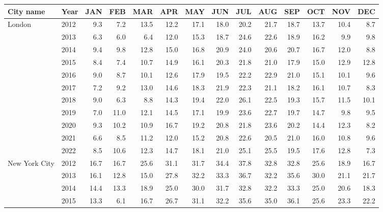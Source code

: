 \begin{table}[htbp]
\small
\begin{adjustwidth}{-1in}{-1in} %
\centering
\begin{tabular}{llrrrrrrrrrrrr}
\toprule
      City name & Year &   JAN &   FEB &   MAR &   APR &   MAY &   JUN &   JUL &   AUG &   SEP &   OCT &   NOV &   DEC \\
\midrule
London & 2012 &   9.3 &   7.2 &  13.5 &  12.2 &  17.1 &  18.0 &  20.2 &  21.7 &  18.7 &  13.7 &  10.4 &   8.7 \\
      & 2013 &   6.3 &   6.0 &   6.4 &  12.0 &  15.3 &  18.7 &  24.6 &  22.6 &  18.9 &  16.2 &   9.9 &   9.8 \\
      & 2014 &   9.4 &   9.8 &  12.8 &  15.0 &  16.8 &  20.9 &  24.0 &  20.6 &  20.7 &  16.7 &  12.0 &   8.8 \\
      & 2015 &   8.4 &   7.4 &  10.7 &  14.9 &  16.1 &  20.3 &  21.8 &  21.0 &  17.9 &  15.0 &  12.9 &  12.8 \\
      & 2016 &   9.0 &   8.7 &  10.1 &  12.6 &  17.9 &  19.5 &  22.2 &  22.9 &  21.0 &  15.1 &  10.1 &   9.6 \\
      & 2017 &   7.2 &   9.2 &  13.0 &  14.6 &  18.3 &  21.9 &  22.3 &  21.1 &  18.2 &  16.1 &  10.7 &   8.3 \\
      & 2018 &   9.0 &   6.3 &   8.8 &  14.3 &  19.4 &  22.0 &  26.1 &  22.5 &  19.3 &  15.7 &  11.5 &  10.1 \\
      & 2019 &   7.0 &  11.0 &  12.1 &  14.5 &  17.1 &  19.9 &  23.6 &  22.7 &  19.7 &  14.7 &   9.8 &   9.5 \\
      & 2020 &   9.3 &  10.2 &  10.9 &  16.7 &  19.2 &  20.8 &  21.8 &  23.6 &  20.2 &  14.4 &  12.3 &   8.2 \\
      & 2021 &   6.6 &   8.5 &  11.2 &  12.0 &  15.2 &  20.8 &  22.6 &  20.5 &  21.0 &  16.0 &  10.8 &   9.6 \\
      & 2022 &   8.5 &  10.6 &  12.3 &  14.7 &  18.1 &  21.0 &  25.1 &  25.5 &  19.5 &  17.6 &  12.8 &   7.3 \\
      \midrule
New York City & 2012 &  16.7 &  16.7 &  25.6 &  31.1 &  31.7 &  34.4 &  37.8 &  32.8 &  32.8 &  25.6 &  18.9 &  16.7 \\
      & 2013 &  16.1 &  12.8 &  15.0 &  27.8 &  32.2 &  33.3 &  36.7 &  32.2 &  35.6 &  30.0 &  21.1 &  21.7 \\
      & 2014 &  14.4 &  13.3 &  18.9 &  25.0 &  30.0 &  31.7 &  32.8 &  32.2 &  33.3 &  25.0 &  20.6 &  18.3 \\
      & 2015 &  13.3 &   6.1 &  16.7 &  26.7 &  31.1 &  32.2 &  35.6 &  35.0 &  36.1 &  25.6 &  23.3 &  22.2 \\

\end{tabular}
\end{adjustwidth}
\end{table}
